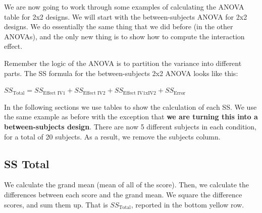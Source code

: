 \documentclass[
]{book}
\begin{document}
We are now going to work through some examples of calculating the ANOVA table for 2x2 designs. We will start with the between-subjects ANOVA for 2x2 designs. We do essentially the same thing that we did before (in the other ANOVAs), and the only new thing is to show how to compute the interaction effect.

Remember the logic of the ANOVA is to partition the variance into different parts. The SS formula for the between-subjects 2x2 ANOVA looks like this:

\(SS_\text{Total} = SS_\text{Effect IV1} + SS_\text{Effect IV2} + SS_\text{Effect IV1xIV2} + SS_\text{Error}\)

In the following sections we use tables to show the calculation of each SS. We use the same example as before with the exception that \textbf{we are turning this into a between-subjects design}. There are now 5 different subjects in each condition, for a total of 20 subjects. As a result, we remove the subjects column.

\subsection{SS Total}\label{ss-total-2}

We calculate the grand mean (mean of all of the score). Then, we calculate the differences between each score and the grand mean. We square the difference scores, and sum them up. That is \(SS_\text{Total}\), reported in the bottom yellow row.
\end{document}
